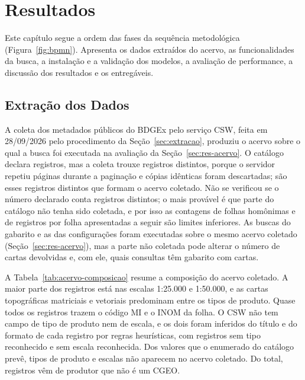 \chapter{Resultados}
\label{cap:resultados}

Este capítulo segue a ordem das fases da sequência metodológica (Figura~\ref{fig:bpmn}). Apresenta os dados extraídos do acervo, as funcionalidades da busca, a instalação e a validação dos modelos, a avaliação de performance, a discussão dos resultados e os entregáveis.

\section{Extração dos Dados}
\label{sec:res-extracao}

A coleta dos metadados públicos do BDGEx pelo serviço CSW, feita em 28/09/2026 pelo procedimento da Seção~\ref{sec:extracao}, produziu o acervo sobre o qual a busca foi executada na avaliação da Seção~\ref{sec:res-acervo}. O catálogo declara  registros, mas a coleta trouxe  registros distintos, porque o servidor repetiu páginas durante a paginação e  cópias idênticas foram descartadas; são esses registros distintos que formam o acervo coletado. Não se verificou se o número declarado conta registros distintos; o mais provável é que parte do catálogo não tenha sido coletada, e por isso as contagens de folhas homônimas e de registros por folha apresentadas a seguir são limites inferiores. As buscas do gabarito e as das configurações foram executadas sobre o mesmo acervo coletado (Seção~\ref{sec:res-acervo}), mas a parte não coletada pode alterar o número de cartas devolvidas e, com ele, quais consultas têm gabarito com cartas.

A Tabela~\ref{tab:acervo-composicao} resume a composição do acervo coletado. A maior parte dos registros está nas escalas 1:25.000 e 1:50.000, e as cartas topográficas matriciais e vetoriais predominam entre os tipos de produto. Quase todos os registros trazem o código MI e o INOM da folha. O CSW não tem campo de tipo de produto nem de escala, e os dois foram inferidos do título e do formato de cada registro por regras heurísticas, com  registros sem tipo reconhecido e  sem escala reconhecida. Dos valores que o enumerado do catálogo prevê,  tipos de produto e  escalas não aparecem no acervo coletado. Do total,  registros vêm de produtor que não é um CGEO.

